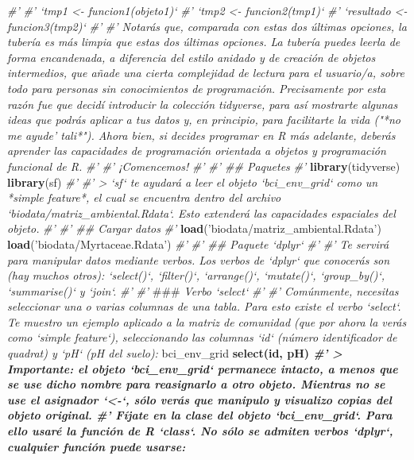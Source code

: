 \documentclass[11pt,]{article}
\newenvironment{Shaded}{\begin{snugshade}}{\end{snugshade}}
\newcommand{\KeywordTok}[1]{\textcolor[rgb]{0.13,0.29,0.53}{\textbf{#1}}}
\newcommand{\StringTok}[1]{\textcolor[rgb]{0.31,0.60,0.02}{#1}}
\newcommand{\CommentTok}[1]{\textcolor[rgb]{0.56,0.35,0.01}{\textit{#1}}}
\newcommand{\OperatorTok}[1]{\textcolor[rgb]{0.81,0.36,0.00}{\textbf{#1}}}
\newcommand{\AlertTok}[1]{\textcolor[rgb]{0.94,0.16,0.16}{#1}}
\newcommand{\NormalTok}[1]{#1}
\begin{document}
\begin{Shaded}
\begin{Highlighting}[]
{{{\CommentTok{#' }
\CommentTok{#' `tmp1 <- funcion1(objeto1)`}
\CommentTok{#' `tmp2 <- funcion2(tmp1)`}
\CommentTok{#' `resultado <- funcion3(tmp2)`}
\CommentTok{#' }
\CommentTok{#' Notarás que, comparada con estas dos últimas opciones, la tubería es más limpia que estas dos últimas opciones. La tubería puedes leerla de forma encandenada, a diferencia del estilo anidado y de creación de objetos intermedios, que añade una cierta complejidad de lectura para el usuario/a, sobre todo para personas sin conocimientos de programación. Precisamente por esta razón fue que decidí introducir la colección tidyverse, para así mostrarte algunas ideas que podrás aplicar a tus datos y, en principio, para facilitarte la vida ("*no me ayude' tali*"). Ahora bien, si decides programar en R más adelante, deberás aprender las capacidades de programación orientada a objetos y programación funcional de R.}
\CommentTok{#' }
\CommentTok{#' ¡Comencemos!}
\CommentTok{#' }
\CommentTok{#' ## Paquetes}
\CommentTok{#' }
\KeywordTok{library}\NormalTok{(tidyverse)}
\KeywordTok{library}\NormalTok{(sf)}
\CommentTok{#' }
\CommentTok{#' > `sf` te ayudará a leer el objeto `bci_env_grid` como un *simple feature*, el cual se encuentra dentro del archivo `biodata/matriz_ambiental.Rdata`. Esto extenderá las capacidades espaciales del objeto.}
\CommentTok{#' }
\CommentTok{#' ## Cargar datos}
\CommentTok{#' }
\KeywordTok{load}\NormalTok{(}\StringTok{'biodata/matriz_ambiental.Rdata'}\NormalTok{)}
\KeywordTok{load}\NormalTok{(}\StringTok{'biodata/Myrtaceae.Rdata'}\NormalTok{)}
\CommentTok{#'  }
\CommentTok{#' ## Paquete `dplyr`}
\CommentTok{#' }
\CommentTok{#' Te servirá para manipular datos mediante verbos. Los verbos de `dplyr` que conocerás son (hay muchos otros): `select()`, `filter()`, `arrange()`, `mutate()`, `group_by()`, `summarise()` y `join`.}
\CommentTok{#' }
\CommentTok{#' }\AlertTok{###}\CommentTok{ Verbo `select`}
\CommentTok{#' }
\CommentTok{#' Comúnmente, necesitas seleccionar una o varias columnas de una tabla. Para esto existe el verbo `select`. Te muestro un ejemplo aplicado a la matriz de comunidad (que por ahora la verás como `simple feature`), seleccionando las columnas `id` (número identificador de quadrat) y `pH` (pH del suelo):}
\NormalTok{bci_env_grid }\OperatorTok{%
\StringTok{  }\KeywordTok{select}\NormalTok{(id, pH)}
\CommentTok{#' > Importante: el objeto `bci_env_grid` permanece intacto, a menos que se use dicho nombre para reasignarlo a otro objeto. Mientras no se use el asignador `<-`, sólo verás que manipulo y visualizo copias del objeto original.}
\CommentTok{#' Fíjate en la clase del objeto `bci_env_grid`. Para ello usaré la función de R `class`. No sólo se admiten verbos `dplyr`, cualquier función puede usarse:}
}}}}
\end{Highlighting}
\end{Shaded}
\end{document}
